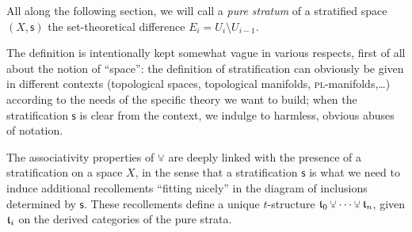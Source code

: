 All along the following section, we will call a \emph{pure stratum} of a stratified space $(X, \mathsf{s})$ the set\hyp{}theoretical difference $E_i = U_i\setminus U_{i-1}$.
\begin{remark}
The definition is intentionally kept somewhat vague in various respects, first of all about the notion of ``space'': the definition of stratification can obviously be given in different contexts (topological spaces, topological manifolds, \textsc{pl}\hyp{}manifolds,\@\xspace\dots) according to the needs of the specific theory we want to build; when the stratification $\textsf{s}$ is clear from the context, we indulge to harmless, obvious abuses of notation.
\end{remark}
The associativity properties of $\glue$ are deeply linked with the presence of a stratification on a space $X$, in the sense that a stratification $\mathsf{s}$ is what we need to induce additional recollements ``fitting nicely'' in the diagram of inclusions determined by $\mathsf{s}$. These recollements define a unique $t$\hyp{}structure $\tee_0\glue\cdots \glue \tee_n$, given $\mathfrak{t}_i$ on the derived categories of the pure strata.


